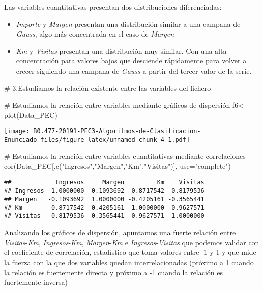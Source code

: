 \documentclass[]{article}
\newenvironment{Shaded}{\begin{snugshade}}{\end{snugshade}}
\newcommand{\KeywordTok}[1]{\textcolor[rgb]{0.94,0.87,0.69}{#1}}
\newcommand{\DataTypeTok}[1]{\textcolor[rgb]{0.87,0.87,0.75}{#1}}
\newcommand{\StringTok}[1]{\textcolor[rgb]{0.80,0.58,0.58}{#1}}
\newcommand{\CommentTok}[1]{\textcolor[rgb]{0.50,0.62,0.50}{#1}}
\newcommand{\NormalTok}[1]{\textcolor[rgb]{0.80,0.80,0.80}{#1}}
\begin{document}
Las variables cuantitativas presentan dos distribuciones diferenciadas:

\begin{itemize}
\item
  \emph{Importe} y \emph{Margen} presentan una distribución similar a
  una campana de \emph{Gauss}, algo más concentrada en el caso de
  \emph{Margen}
\item
  \emph{Km} y \emph{Visitas} presentan una distribución muy similar. Con
  una alta concentración para valores bajos que desciende rápidamente
  para volver a crecer siguiendo una campana de \emph{Gauss} a partir
  del tercer valor de la serie.
\end{itemize}

\begin{Shaded}
\begin{Highlighting}[]
\CommentTok{# 3.Estudiamos la relación existente entre las variables del fichero}

\CommentTok{# Estudiamos la relación entre variables mediante gráficos de dispersión}
\NormalTok{f6<-}\StringTok{ }\KeywordTok{plot}\NormalTok{(Data_PEC)                                              }
\end{Highlighting}
\end{Shaded}

\texttt{[image: B0.477-20191-PEC3-Algoritmos-de-Clasificacion-Enunciado\_files/figure-latex/unnamed-chunk-4-1.pdf]}

\begin{Shaded}
\begin{Highlighting}[]
\CommentTok{# Estudiamos la relación entre variables cuantitativas mediante correlaciones}
\KeywordTok{cor}\NormalTok{(Data_PEC[,}\KeywordTok{c}\NormalTok{(}\StringTok{"Ingresos"}\NormalTok{,}\StringTok{"Margen"}\NormalTok{,}\StringTok{"Km"}\NormalTok{,}\StringTok{"Visitas"}\NormalTok{)], }\DataTypeTok{use=}\StringTok{"complete"}\NormalTok{)}
\end{Highlighting}
\end{Shaded}

\begin{verbatim}
##            Ingresos     Margen         Km    Visitas
## Ingresos  1.0000000 -0.1093692  0.8717542  0.8179536
## Margen   -0.1093692  1.0000000 -0.4205161 -0.3565441
## Km        0.8717542 -0.4205161  1.0000000  0.9627571
## Visitas   0.8179536 -0.3565441  0.9627571  1.0000000
\end{verbatim}

Analizando los gráficos de dispersión, apuntamos una fuerte relación
entre \emph{Visitas}-\emph{Km}, \emph{Ingresos}-\emph{Km},
\emph{Margen}-\emph{Km} e \emph{Ingresos}-\emph{Visitas} que podemos
validar con el coeficiente de correlación, estadístico que toma valores
entre -1 y 1 y que mide la fuerza con la que dos variables quedan
interrelacionadas (próximo a 1 cuando la relación es fuertemente directa
y próximo a -1 cuando la relación es fuertemente inversa)
\end{document}
